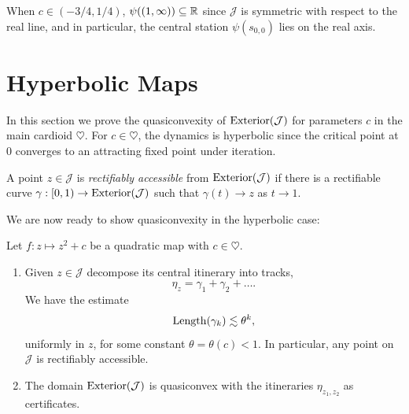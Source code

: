 When $c \in (-3/4, 1/4)$, $\psi ((1,\infty))\subseteq\mathbb{R}$ since $\mathcal{J}$ is symmetric with respect to the real line, and in particular, the central station $\psi(s_{0,0})$ lies on the real axis.


\section{Hyperbolic Maps}
In this section we prove the quasiconvexity of $\operatorname{Exterior}(\mathcal J)$ for parameters $c$ in the main cardioid $\heartsuit$. For $c \in \heartsuit$, the dynamics is hyperbolic since the critical point at 0 converges to an attracting fixed point under iteration.




\begin{definition}
	A point $z \in \mathcal J$ is \emph{rectifiably accessible} from $\operatorname{Exterior}(\mathcal J)$ if there is a rectifiable curve $\gamma: [0,1) \to \operatorname{Exterior}(\mathcal J)$ such that $\gamma (t) \to z$ as $t \to 1$.
\end{definition}

We are now ready to show quasiconvexity in the hyperbolic case:

\begin{theorem}  Let $f:z \mapsto z^2+c$ be a quadratic map with $c \in \heartsuit$. \leavevmode
\begin{enumerate}[label=\normalfont(\roman*)]

\item Given $z\in\mathcal{J}$ decompose its central itinerary into tracks, 
\begin{equation*}
\eta_z = \gamma _1 +\gamma_2 +\dots.
\end{equation*}
We have the estimate
\begin{equation*}
\operatorname{Length}(\gamma_{k})\lesssim\theta^{k},
\end{equation*}
uniformly in $z$, for some constant $\theta=\theta(c)<1$. 
In particular, any point on \(\mathcal{J}\) is rectifiably accessible.

\item The domain $\operatorname{Exterior}(\mathcal{J})$ is quasiconvex with the itineraries $\eta_{z_1,z_2}$ as certificates.
	\end{enumerate}
\end{theorem}

